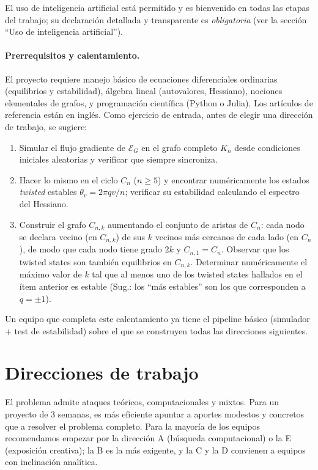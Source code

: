\documentclass[11pt,a4paper]{article}
\begin{document}
El uso de inteligencia artificial está permitido y es bienvenido en todas las etapas del trabajo; su declaración detallada y transparente es \emph{obligatoria} (ver la sección ``Uso de inteligencia artificial'').

\paragraph{Prerrequisitos y calentamiento.}
El proyecto requiere manejo básico de ecuaciones diferenciales ordinarias (equilibrios y estabilidad), álgebra lineal (autovalores, Hessiano), nociones elementales de grafos, y programación científica (Python o Julia). Los artículos de referencia están en inglés. Como ejercicio de entrada, antes de elegir una dirección de trabajo, se sugiere:
\begin{enumerate}
    \item Simular el flujo gradiente de $\mathcal{E}_G$ en el grafo completo $K_n$ desde condiciones iniciales aleatorias y verificar que siempre sincroniza.
    \item Hacer lo mismo en el ciclo $C_n$ ($n\ge 5$) y encontrar numéricamente los estados \emph{twisted} estables $\theta_v = 2\pi q v/n$; verificar su estabilidad calculando el espectro del Hessiano.
    \item Construir el grafo $C_{n,k}$ aumentando el conjunto de aristas de $C_n$: cada nodo se declara vecino (en $C_{n,k}$) de sus $k$ vecinos más cercanos de cada lado (en $C_n$), de modo que cada nodo tiene grado $2k$ y $C_{n,1}=C_n$. Observar que los twisted states son también equilibrios en $C_{n,k}$. Determinar numéricamente el máximo valor de $k$ tal que al menos uno de los twisted states hallados en el ítem anterior es estable (Sug.: los ``más estables'' son los que corresponden a $q=\pm 1$).
\end{enumerate}
Un equipo que completa este calentamiento ya tiene el pipeline básico (simulador + test de estabilidad) sobre el que se construyen todas las direcciones siguientes.



\section*{Direcciones de trabajo}

El problema admite ataques teóricos, computacionales y mixtos. Para un proyecto de 3 semanas, es más eficiente apuntar a aportes modestos y concretos que a resolver el problema completo. Para la mayoría de los equipos recomendamos empezar por la dirección A (búsqueda computacional) o la E (exposición creativa); la B es la más exigente, y la C y la D convienen a equipos con inclinación analítica.
\end{document}
